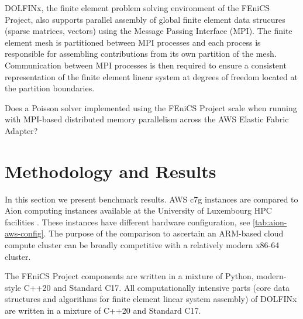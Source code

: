 DOLFINx, the finite element problem solving environment of the FEniCS Project,
also supports parallel assembly of global finite element data strucures (sparse
matrices, vectors) using the Message Passing Interface (MPI). The finite
element mesh is partitioned between MPI processes and each process is
responsible for assembling contributions from its own partition of the mesh.
Communication between MPI processes is then required to ensure a consistent
representation of the finite element linear system at degrees of freedom
located at the partition boundaries.

Does a Poisson solver implemented using the FEniCS Project scale when running
with MPI-based distributed memory parallelism across the AWS Elastic Fabric
Adapter?

\section*{Methodology and Results}
In this section we present benchmark results. AWS c7g instances are compared to
Aion computing instances available at the University of Luxembourg HPC
facilities \cite{VCPKVO_HPCCT22}. These instances have different hardware
configuration, see \autoref{tab:aion-aws-config}. The purpose of the comparison
to ascertain an ARM-based cloud compute cluster can be broadly competitive with
a relatively modern x86-64 cluster.

The FEniCS Project components are written in a mixture of Python, modern-style
C++20 and Standard C17. All computationally intensive parts (core data
structures and algorithms for finite element linear system assembly) of DOLFINx
are written in a mixture of C++20 and Standard C17.


